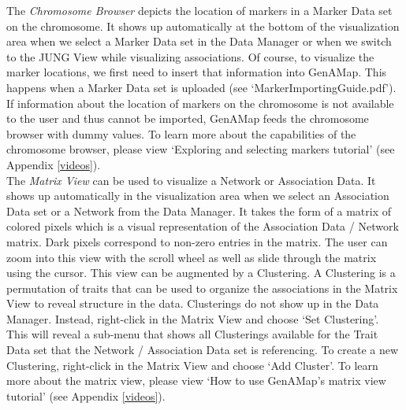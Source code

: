 \documentclass{article}
\begin{document}
The {\it Chromosome Browser} depicts the location of markers in a Marker Data set on the chromosome. It shows up automatically at the bottom of the visualization area when we select a Marker Data set in the Data Manager or when we switch to the JUNG View while visualizing associations. Of course, to visualize the marker locations, we first need to insert that information into GenAMap. This happens when a Marker Data set is uploaded (see `MarkerImportingGuide.pdf'). If information about the location of markers on the chromosome is not available to the user and thus cannot be imported, GenAMap feeds the chromosome browser with dummy values. To learn more about the capabilities of the chromosome browser, please view `Exploring and selecting markers tutorial' (see Appendix \ref{videos}). \\

The {\it Matrix View} can be used to visualize a Network or Association Data. It shows up automatically in the visualization area when we select an Association Data set or  a Network from the Data Manager. It takes the form of a matrix of colored pixels which is a visual representation of the Association Data / Network matrix. Dark pixels correspond to non-zero entries in the matrix. The user can zoom into this view with the scroll wheel as well as slide through the matrix using the cursor. This view can be augmented by a Clustering. A Clustering is a permutation of traits that can be used to organize the associations in the Matrix View to reveal structure in the data. Clusterings do not show up in the Data Manager. Instead, right-click in the Matrix View and choose `Set Clustering'. This will reveal a sub-menu that shows all Clusterings available for the Trait Data set that the Network / Association Data set is referencing. To create a new Clustering, right-click in the Matrix View and choose `Add Cluster'. To learn more about the matrix view, please view `How to use GenAMap's matrix view tutorial' (see Appendix \ref{videos}).\\
\end{document}
